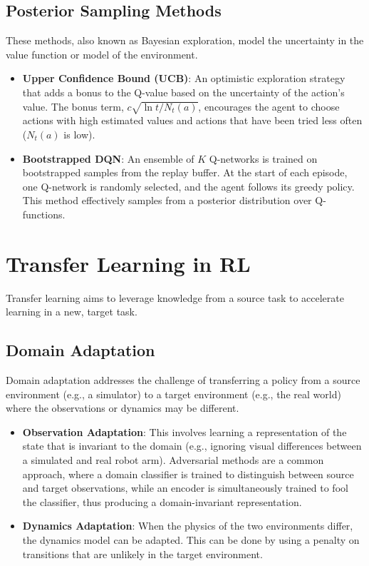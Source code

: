 \documentclass[12pt]{article}
\begin{document}
\subsection{Posterior Sampling Methods}
These methods, also known as Bayesian exploration, model the uncertainty in the value function or model of the environment.
\begin{itemize}
    \item \textbf{Upper Confidence Bound (UCB)}: An optimistic exploration strategy that adds a bonus to the Q-value based on the uncertainty of the action's value. The bonus term, $c \sqrt{\ln t / N_t(a)}$, encourages the agent to choose actions with high estimated values and actions that have been tried less often ($N_t(a)$ is low).
    \item \textbf{Bootstrapped DQN}: An ensemble of $K$ Q-networks is trained on bootstrapped samples from the replay buffer. At the start of each episode, one Q-network is randomly selected, and the agent follows its greedy policy. This method effectively samples from a posterior distribution over Q-functions.
\end{itemize}

\section{Transfer Learning in RL }
Transfer learning aims to leverage knowledge from a source task to accelerate learning in a new, target task.

\subsection{Domain Adaptation}
Domain adaptation addresses the challenge of transferring a policy from a source environment (e.g., a simulator) to a target environment (e.g., the real world) where the observations or dynamics may be different.
\begin{itemize}
    \item \textbf{Observation Adaptation}: This involves learning a representation of the state that is invariant to the domain (e.g., ignoring visual differences between a simulated and real robot arm). Adversarial methods are a common approach, where a domain classifier is trained to distinguish between source and target observations, while an encoder is simultaneously trained to fool the classifier, thus producing a domain-invariant representation.
    \item \textbf{Dynamics Adaptation}: When the physics of the two environments differ, the dynamics model can be adapted. This can be done by using a penalty on transitions that are unlikely in the target environment.
\end{itemize}
\end{document}
